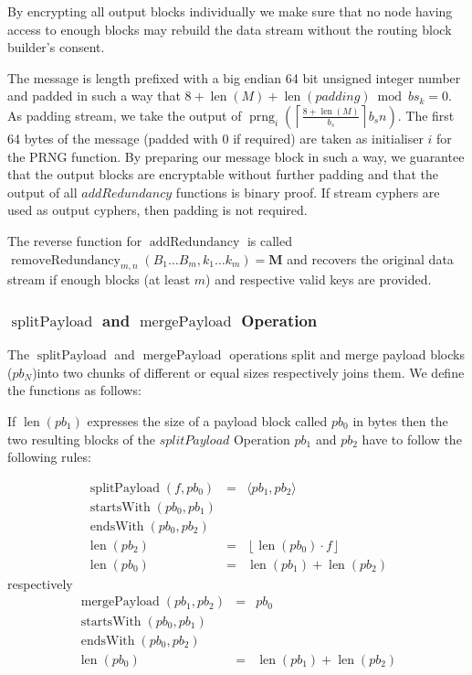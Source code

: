 \documentclass[9pt,journal,compsoc]{IEEEtran}
\DeclareMathOperator{\prng}{prng}
\DeclareMathOperator{\len}{len}
\DeclareMathOperator{\splitPayload}{splitPayload}
\DeclareMathOperator{\mergePayload}{mergePayload}
\DeclareMathOperator{\startsWith}{startsWith}
\DeclareMathOperator{\lendsWith}{endsWith}
\DeclareMathOperator{\addRedundancy}{addRedundancy}
\DeclareMathOperator{\removeRedundancy}{removeRedundancy}
\begin{document}
By encrypting all output blocks individually we make sure that no node having access to enough blocks may rebuild the data stream without the routing block builder's consent.

The message is length prefixed with a big endian 64 bit unsigned integer number and padded in such a way that $8+\len(M)+\len(padding) \bmod bs_k =0$. As padding stream, we take the output of $\prng_i\left(\left\lceil\frac{8+\len(M)}{b_s}\right\rceil b_s n\right )$. The first 64 bytes of the message (padded with 0 if required) are taken as initialiser $i$ for the PRNG function. By preparing our message block in such a way, we guarantee that the output blocks are encryptable without further padding and that the output of all $addRedundancy$ functions is binary proof. If stream cyphers are used as output cyphers, then padding is not required.

The reverse function for $\addRedundancy$ is called $\removeRedundancy_{m,n}(B_1\ldots B_{m},k_1\ldots k_{m})=\mathbf{M}$ and recovers the original data stream if enough blocks (at least $m$) and respective valid keys are provided. 

\subsubsection{$\splitPayload$ and $\mergePayload$ Operation}
The $\splitPayload$ and $\mergePayload$ operations split and merge payload blocks ($pb_N$)into two chunks of different or equal sizes respectively joins them. We define the functions as follows:

If $\len(pb_1)$ expresses the size of a payload block called $pb_0$ in bytes then the two resulting blocks of the $splitPayload$ Operation $pb_1$ and $pb_2$ have to follow the following rules:

\begin{eqnarray}
\splitPayload(f, pb_0) & = &\langle pb_1, pb_2 \rangle\\
\startsWith(pb_0, pb_1)\\
\lendsWith(pb_0, pb_2)\\
\len(pb_2) & = & \left\lfloor \len(pb_0)\cdot f\right \rfloor\\
\len(pb_0) & = & \len(pb_1) + \len(pb_2)
\end{eqnarray}
respectively
\begin{eqnarray}
\mergePayload(pb_1, pb_2) & = & pb_0 \\
\startsWith(pb_0, pb_1)\\
\lendsWith(pb_0, pb_2)\\
\len(pb_0) & = & \len(pb_1) + \len(pb_2)
\end{eqnarray}
 
\end{document}
